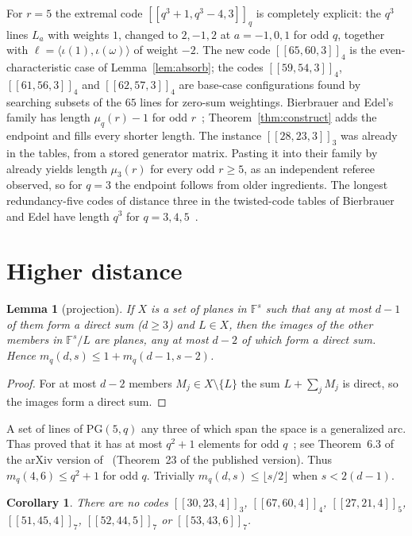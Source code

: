\documentclass[11pt]{amsart}
\newtheorem{lemma}[theorem]{Lemma}
\newtheorem{corollary}[theorem]{Corollary}
\theoremstyle{definition}
\theoremstyle{remark}
\newcommand{\F}{\mathbb F}
\newcommand{\qq}[1]{[\![#1]\!]}
\begin{document}
For $r=5$ the extremal code $\qq{q^3+1,q^3-4,3}_q$ is completely explicit: the $q^3$ lines $L_a$ with weights $1$, changed to $2,-1,2$ at $a=-1,0,1$ for odd $q$, together with $\ell=\langle\iota(1),\iota(\omega)\rangle$ of weight $-2$. The new code $\qq{65,60,3}_4$ is the even-characteristic case of Lemma~\ref{lem:absorb}; the codes $\qq{59,54,3}_4$, $\qq{61,56,3}_4$ and $\qq{62,57,3}_4$ are base-case configurations found by searching subsets of the $65$ lines for zero-sum weightings. Bierbrauer and Edel's family has length $\mu_q(r)-1$ for odd $r$~\cite[Theorem~12]{BierbrauerEdel2000}; Theorem~\ref{thm:construct} adds the endpoint and fills every shorter length. The instance $\qq{28,23,3}_3$ was already in the tables, from a stored generator matrix. Pasting it into their family by~\cite[Theorem~11]{BierbrauerEdel2000} already yields length $\mu_3(r)$ for every odd $r\ge5$, as an independent referee observed, so for $q=3$ the endpoint follows from older ingredients. The longest redundancy-five codes of distance three in the twisted-code tables of Bierbrauer and Edel have length $q^3$ for $q=3,4,5$~\cite{EdelTables}.

\section{Higher distance}\label{sec:higher}

\begin{lemma}[projection]\label{lem:projection}
If $X$ is a set of planes in $\F^s$ such that any at most $d-1$ of them form a direct sum ($d\ge3$) and $L\in X$, then the images of the other members in $\F^s/L$ are planes, any at most $d-2$ of which form a direct sum. Hence $m_q(d,s)\le1+m_q(d-1,s-2)$.
\end{lemma}

\begin{proof}
For at most $d-2$ members $M_j\in X\setminus\{L\}$ the sum $L+\sum_jM_j$ is direct, so the images form a direct sum.
\end{proof}

A set of lines of $\mathrm{PG}(5,q)$ any three of which span the space is a generalized arc. Thas proved that it has at most $q^2+1$ elements for odd $q$~\cite{Thas1971}; see Theorem~6.3 of the arXiv version of~\cite{HirschfeldThas2025} (Theorem~23 of the published version). Thus $m_q(4,6)\le q^2+1$ for odd $q$. Trivially $m_q(d,s)\le\lfloor s/2\rfloor$ when $s<2(d-1)$.

\begin{corollary}\label{cor:higher}
There are no codes $\qq{30,23,4}_3$, $\qq{67,60,4}_4$, $\qq{27,21,4}_5$, $\qq{51,45,4}_7$, $\qq{52,44,5}_7$ or $\qq{53,43,6}_7$.
\end{corollary}
\end{document}
